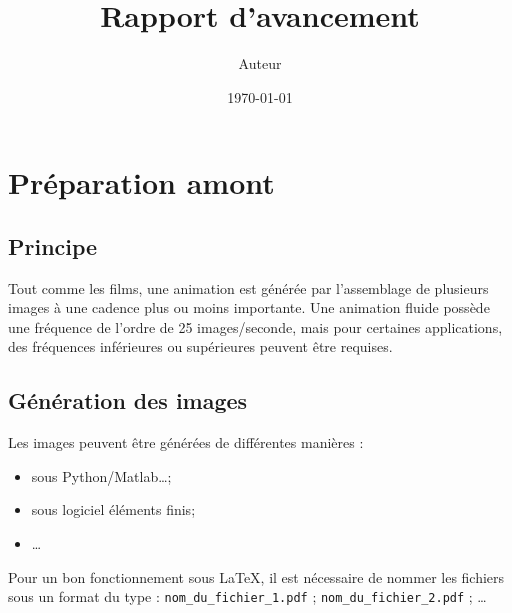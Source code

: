 \documentclass[a4paper,12pt]{report}
\author{Auteur}
\title{Rapport d'avancement}
\date{\today}
\begin{document}
\graphicspath{{Figures/}}




\renewcommand\contentsname{Sommaire}
\setcounter{chapter}{1}
\tableofcontents



\newpage

\section{Préparation amont}
\subsection{Principe}
Tout comme les films, une animation est générée par l'assemblage de plusieurs images à une cadence plus ou moins importante. Une animation fluide possède une fréquence de l'ordre de 25 images/seconde, mais pour certaines applications, des fréquences inférieures ou supérieures peuvent être requises.

\subsection{Génération des images}
Les images peuvent être générées de différentes manières :
\begin{itemize}
\item sous Python/Matlab\ldots;
\item sous logiciel éléments finis;
\item \ldots
\end{itemize}

Pour un bon fonctionnement sous \LaTeX, il est nécessaire de nommer les fichiers sous un format du type : \verb|nom_du_fichier_1.pdf| ; \verb|nom_du_fichier_2.pdf| ; \ldots
\end{document}
